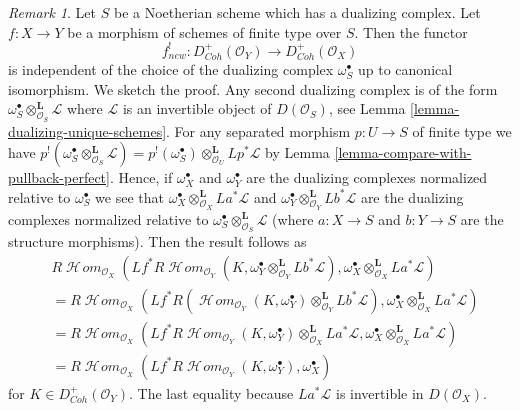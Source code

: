 \documentclass{stacks-project}
\theoremstyle{plain}
\theoremstyle{definition}
\theoremstyle{remark}
\newtheorem{remark}[subsection]{Remark}
\numberwithin{equation}{subsection}
\def\SheafHom{\mathop{\mathcal{H}\!\mathit{om}}\nolimits}
\begin{document}
\begin{remark}
\label{remark-independent-omega-S}
Let $S$ be a Noetherian scheme which has a dualizing complex.
Let $f : X \to Y$ be a morphism of schemes of finite type
over $S$. Then the functor
$$
f_{new}^! : D^+_{Coh}(\mathcal{O}_Y) \to D^+_{Coh}(\mathcal{O}_X)
$$
is independent of the choice of the dualizing complex $\omega_S^\bullet$
up to canonical isomorphism. We sketch the proof. Any second dualizing complex
is of the form $\omega_S^\bullet \otimes_{\mathcal{O}_S}^\mathbf{L} \mathcal{L}$
where $\mathcal{L}$ is an invertible object of $D(\mathcal{O}_S)$, see
Lemma \ref{lemma-dualizing-unique-schemes}.
For any separated morphism $p : U \to S$ of finite type we have
$p^!(\omega_S^\bullet \otimes^\mathbf{L}_{\mathcal{O}_S} \mathcal{L}) =
p^!(\omega_S^\bullet) \otimes^\mathbf{L}_{\mathcal{O}_U} Lp^*\mathcal{L}$
by Lemma \ref{lemma-compare-with-pullback-perfect}.
Hence, if $\omega_X^\bullet$ and $\omega_Y^\bullet$ are the
dualizing complexes normalized relative to $\omega_S^\bullet$ we see that
$\omega_X^\bullet \otimes_{\mathcal{O}_X}^\mathbf{L} La^*\mathcal{L}$ and
$\omega_Y^\bullet \otimes_{\mathcal{O}_Y}^\mathbf{L} Lb^*\mathcal{L}$
are the dualizing complexes normalized relative to
$\omega_S^\bullet \otimes_{\mathcal{O}_S}^\mathbf{L} \mathcal{L}$
(where $a : X \to S$ and $b : Y \to S$ are the structure morphisms).
Then the result follows as
\begin{align*}
& R\SheafHom_{\mathcal{O}_X}(Lf^*R\SheafHom_{\mathcal{O}_Y}(K,
\omega_Y^\bullet \otimes_{\mathcal{O}_Y}^\mathbf{L} Lb^*\mathcal{L}),
\omega_X^\bullet \otimes_{\mathcal{O}_X}^\mathbf{L} La^*\mathcal{L}) \\
& = R\SheafHom_{\mathcal{O}_X}(Lf^*R(\SheafHom_{\mathcal{O}_Y}(K,
\omega_Y^\bullet) \otimes_{\mathcal{O}_Y}^\mathbf{L} Lb^*\mathcal{L}),
\omega_X^\bullet \otimes_{\mathcal{O}_X}^\mathbf{L} La^*\mathcal{L}) \\
& = R\SheafHom_{\mathcal{O}_X}(Lf^*R\SheafHom_{\mathcal{O}_Y}(K,
\omega_Y^\bullet) \otimes_{\mathcal{O}_X}^\mathbf{L} La^*\mathcal{L},
\omega_X^\bullet \otimes_{\mathcal{O}_X}^\mathbf{L} La^*\mathcal{L}) \\
& = R\SheafHom_{\mathcal{O}_X}(Lf^*R\SheafHom_{\mathcal{O}_Y}(K,
\omega_Y^\bullet), \omega_X^\bullet)
\end{align*}
for $K \in D^+_{Coh}(\mathcal{O}_Y)$.
The last equality because $La^*\mathcal{L}$ is invertible in
$D(\mathcal{O}_X)$.
\end{remark}
\end{document}
